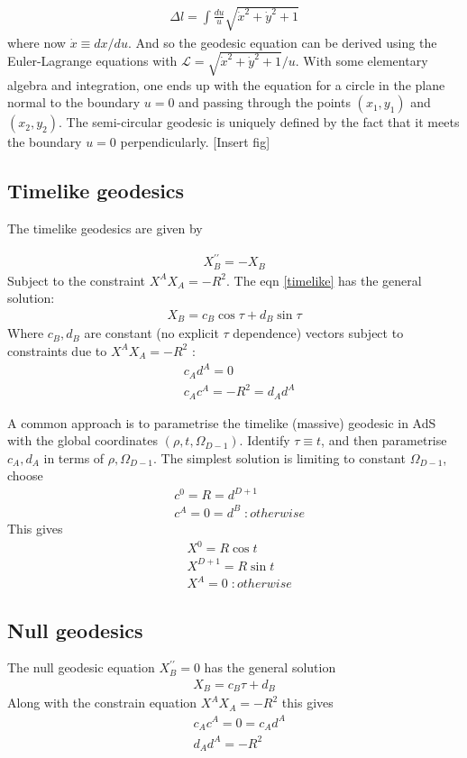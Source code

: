 \begin{align}
 \Delta l = \int \frac{du}{u} \sqrt{\dot{x}^2 + \dot{y}^2 +1}
\end{align}
where now $\dot x \equiv dx/du$. And so the geodesic equation can be derived using the Euler-Lagrange equations with $\mathcal{L} =  \sqrt{\dot{x}^2 + \dot{y}^2 +1}/{u}$. With some elementary algebra and integration, one ends up with the equation for a circle in the plane normal to the boundary $u=0$ and passing through the points $(x_1,y_1)$ and $(x_2,y_2)$. The semi-circular geodesic is uniquely defined by the fact that it meets the boundary $u=0$ perpendicularly. [Insert fig]



\subsection{Timelike geodesics}
The timelike geodesics are given by

\begin{align}
  X_B^{\prime\prime} = - X_B \label{timelike}
\end{align}
Subject to the constraint $ X^A X_A = -R^2$.
The eqn \ref{timelike} has the general solution:
\begin{align}
 X_B = c_B \cos\tau + d_B \sin \tau
\end{align}
Where $c_B, d_B$ are constant (no explicit $\tau$ dependence) vectors subject to constraints due to $ X^A X_A = -R^2$ :
\begin{align}
 &c_A d^A = 0 \\
 &c_A c^A = -R^2 = d_A d^A 
\end{align}

A common approach is to parametrise the timelike (massive) geodesic in AdS with the global coordinates $(\rho, t, \Omega_{D-1})$. Identify $\tau \equiv t$, and then parametrise $c_A, d_A$ in terms of $\rho, \Omega_{D-1}$. The simplest solution is limiting to constant $\Omega_{D-1}$, choose 
\begin{align}
 &c^0=R=d^{D+1} \\
 &c^A=0=d^B \;:otherwise
\end{align}
This gives
\begin{align}
 &X^0 = R\cos t \\
 &X^{D+1} = R \sin t \\
 &X^A = 0 \; :otherwise
\end{align}

%

\subsection{Null geodesics}
The null geodesic equation $ X_B^{\prime\prime} = 0$ has the general solution
\begin{align}
 X_B = c_B \tau + d_B
\end{align}
Along with the constrain equation $X^A X_A = -R^2$ this gives
\begin{align}
 &c_Ac^A = 0 = c_Ad^A \\
 &d_Ad^A=-R^2
\end{align}

